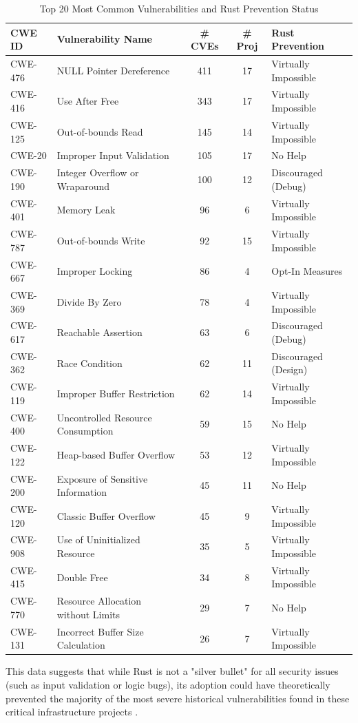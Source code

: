 \begin{table}[h]
\centering
\label{tab:vulnerabilities}
\begin{tabularx}{\textwidth}{|l|X|c|c|l|}
\hline
\textbf{CWE ID} & \textbf{Vulnerability Name} & \textbf{\# CVEs} & \textbf{\# Proj} & \textbf{Rust Prevention} \\ \hline
CWE-476 & NULL Pointer Dereference & 411 & 17 & Virtually Impossible \\ \hline
CWE-416 & Use After Free & 343 & 17 & Virtually Impossible \\ \hline
CWE-125 & Out-of-bounds Read & 145 & 14 & Virtually Impossible \\ \hline
CWE-20 & Improper Input Validation & 105 & 17 & No Help \\ \hline
CWE-190 & Integer Overflow or Wraparound & 100 & 12 & Discouraged (Debug) \\ \hline
CWE-401 & Memory Leak & 96 & 6 & Virtually Impossible \\ \hline
CWE-787 & Out-of-bounds Write & 92 & 15 & Virtually Impossible \\ \hline
CWE-667 & Improper Locking & 86 & 4 & Opt-In Measures \\ \hline
CWE-369 & Divide By Zero & 78 & 4 & Virtually Impossible \\ \hline
CWE-617 & Reachable Assertion & 63 & 6 & Discouraged (Debug) \\ \hline
CWE-362 & Race Condition & 62 & 11 & Discouraged (Design) \\ \hline
CWE-119 & Improper Buffer Restriction & 62 & 14 & Virtually Impossible \\ \hline
CWE-400 & Uncontrolled Resource Consumption & 59 & 15 & No Help \\ \hline
CWE-122 & Heap-based Buffer Overflow & 53 & 12 & Virtually Impossible \\ \hline
CWE-200 & Exposure of Sensitive Information & 45 & 11 & No Help \\ \hline
CWE-120 & Classic Buffer Overflow & 45 & 9 & Virtually Impossible \\ \hline
CWE-908 & Use of Uninitialized Resource & 35 & 5 & Virtually Impossible \\ \hline
CWE-415 & Double Free & 34 & 8 & Virtually Impossible \\ \hline
CWE-770 & Resource Allocation without Limits & 29 & 7 & No Help \\ \hline
CWE-131 & Incorrect Buffer Size Calculation & 26 & 7 & Virtually Impossible \\ \hline
\end{tabularx}
\caption{Top 20 Most Common Vulnerabilities and Rust Prevention Status \parencite{meneely2025just}}
\end{table}

This data suggests that while Rust is not a "silver bullet" for all security issues (such as input validation or logic bugs), 
its adoption could have theoretically prevented the majority of the most severe historical vulnerabilities 
found in these critical infrastructure projects \parencite{meneely2025just}.